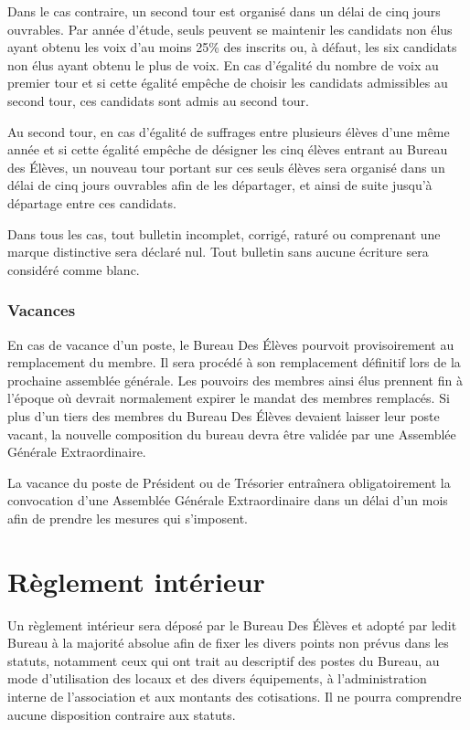 \documentclass{article}
\begin{document}
				Dans le cas contraire, un second tour est organisé dans un délai de
				cinq jours ouvrables. Par année d’étude, seuls peuvent se maintenir
				les candidats non élus ayant obtenu les voix d’au moins 25\% des
				inscrits ou, à défaut, les six candidats non élus ayant obtenu le
				plus de voix. En cas d’égalité du nombre de voix au premier tour et
				si cette égalité empêche de choisir les candidats admissibles au
				second tour, ces candidats sont admis au second tour.

				Au second tour, en cas d'égalité de suffrages entre plusieurs élèves
				d'une même année et si cette égalité empêche de désigner les cinq
				élèves entrant au Bureau des Élèves, un nouveau tour portant sur ces
				seuls élèves sera organisé dans un délai de cinq jours ouvrables afin
				de les départager, et ainsi de suite jusqu’à départage entre ces
				candidats.

				Dans tous les cas, tout bulletin incomplet, corrigé, raturé ou
				comprenant une marque distinctive sera déclaré nul. Tout bulletin
				sans aucune écriture sera considéré comme blanc.

			\subsubsection{Vacances}
				En cas de vacance d'un poste, le Bureau Des Élèves pourvoit
				provisoirement au remplacement du membre. Il sera procédé à son
				remplacement définitif lors de la prochaine assemblée générale. Les
				pouvoirs des membres ainsi élus prennent fin à l’époque où devrait
				normalement expirer le mandat des membres remplacés. Si plus d’un
				tiers des membres du Bureau Des Élèves devaient laisser leur poste
				vacant, la nouvelle composition du bureau devra être validée par une
				Assemblée Générale Extraordinaire.

				La vacance du poste de Président ou de Trésorier entraînera
				obligatoirement la convocation d’une Assemblée Générale
				Extraordinaire dans un délai d’un mois afin de prendre les mesures
				qui s’imposent.

	\section{Règlement intérieur}
		Un règlement intérieur sera déposé par le Bureau Des Élèves et adopté par
		ledit Bureau à la majorité absolue afin de fixer les divers points non prévus
		dans les statuts, notamment ceux qui ont trait au descriptif des postes du
		Bureau, au mode d’utilisation des locaux et des divers équipements, à
		l’administration interne de l’association et aux montants des cotisations. Il
		ne pourra comprendre aucune disposition contraire aux statuts.
\end{document}
